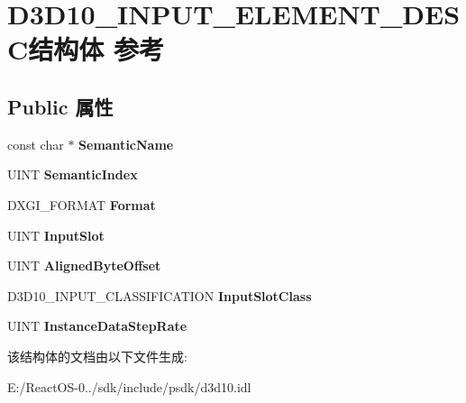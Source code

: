 \hypertarget{struct_d3_d10___i_n_p_u_t___e_l_e_m_e_n_t___d_e_s_c}{}\section{D3\+D10\+\_\+\+I\+N\+P\+U\+T\+\_\+\+E\+L\+E\+M\+E\+N\+T\+\_\+\+D\+E\+S\+C结构体 参考}
\label{struct_d3_d10___i_n_p_u_t___e_l_e_m_e_n_t___d_e_s_c}
\subsection*{Public 属性}
\begin{DoxyCompactItemize}
\item 
\mbox{\label{struct_d3_d10___i_n_p_u_t___e_l_e_m_e_n_t___d_e_s_c_a127f24443f8bc63015cf04813f3b0d92}} 
const char $\ast$ {\bfseries Semantic\+Name}
\item 
\mbox{\label{struct_d3_d10___i_n_p_u_t___e_l_e_m_e_n_t___d_e_s_c_af32fa377ff72bf135dd56abdcc0be99b}} 
U\+I\+NT {\bfseries Semantic\+Index}
\item 
\mbox{\label{struct_d3_d10___i_n_p_u_t___e_l_e_m_e_n_t___d_e_s_c_ad3e3a66a8e1dfa009cbb0e36519d1c8a}} 
D\+X\+G\+I\+\_\+\+F\+O\+R\+M\+AT {\bfseries Format}
\item 
\mbox{\label{struct_d3_d10___i_n_p_u_t___e_l_e_m_e_n_t___d_e_s_c_a9607a68659ff88a6f2d297ba0f1ec05f}} 
U\+I\+NT {\bfseries Input\+Slot}
\item 
\mbox{\label{struct_d3_d10___i_n_p_u_t___e_l_e_m_e_n_t___d_e_s_c_a2b8e6b2dba6ca21c1f6b76d70b4b6c2d}} 
U\+I\+NT {\bfseries Aligned\+Byte\+Offset}
\item 
\mbox{\label{struct_d3_d10___i_n_p_u_t___e_l_e_m_e_n_t___d_e_s_c_af8ac02644a8ece676f59b81abdd57063}} 
D3\+D10\+\_\+\+I\+N\+P\+U\+T\+\_\+\+C\+L\+A\+S\+S\+I\+F\+I\+C\+A\+T\+I\+ON {\bfseries Input\+Slot\+Class}
\item 
\mbox{\label{struct_d3_d10___i_n_p_u_t___e_l_e_m_e_n_t___d_e_s_c_ae78511bd8474234a407f6edf8607bd22}} 
U\+I\+NT {\bfseries Instance\+Data\+Step\+Rate}
\end{DoxyCompactItemize}


该结构体的文档由以下文件生成\+:\begin{DoxyCompactItemize}
\item 
E\+:/\+React\+O\+S-\/0../sdk/include/psdk/d3d10.\+idl\end{DoxyCompactItemize}

